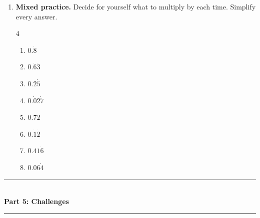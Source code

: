 \documentclass[12pt,a4paper]{article}
\newcommand{\heading}[1]{%
  \vspace{2pt}
  {\color{blue!45!black}\rule{\linewidth}{1pt}}\\[1pt]
  {\large\bfseries #1}\\[-6pt]
  {\color{blue!45!black}\rule{\linewidth}{0.4pt}}
  \vspace{2pt}}
\newcommand{\parttitle}[2]{\heading{Part #1: #2}}
\begin{document}
\begin{enumerate}[resume]
\item \textbf{Mixed practice.} Decide for yourself what to multiply by each
time. Simplify every answer.
\begin{multicols}{4}
\begin{enumerate}
  \item $0.\dot{8}$
  \item $0.\dot{6}\dot{3}$
  \item $0.2\dot{5}$
  \item $0.\dot{0}2\dot{7}$
  \item $0.7\dot{2}$
  \item $0.\dot{1}\dot{2}$
  \item $0.41\dot{6}$
  \item $0.06\dot{4}$
\end{enumerate}
\end{multicols}
\vspace{13em}

\end{enumerate}

\newpage

\parttitle{5}{Challenges}
\end{document}
